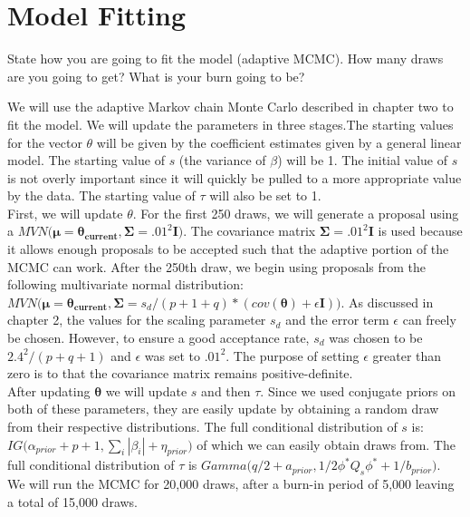 \section{Model Fitting}
State how you are going to fit the model (adaptive MCMC).  How many draws are you going to get?  What is your burn going to be?

We will use the adaptive Markov chain Monte Carlo described in chapter two to fit the model. We will update the parameters in three stages.The starting values for the vector $\theta$ will be given by the coefficient estimates given by a general linear model. The starting value of $s$ (the variance of $\beta$) will be 1. The initial value of $s$ is not overly important since it will quickly be pulled to a more appropriate value by the data. The starting value of $\tau$ will also be set to 1. \\

 First, we will update $\theta$. For the first 250 draws, we will generate a proposal using a $MVN\big(\bm{\mu=\bm{\theta}_{current}}, \bm{\Sigma}=.01^2\bm{I}\big)$. The covariance matrix $\bm{\Sigma}=.01^2\bm{I}$ is used because it allows enough proposals to be accepted such that the adaptive portion of the MCMC can work. After the 250th draw, we begin using proposals from the following multivariate normal distribution: $MVN\big(\bm{\mu=\bm{\theta}_{current}}, \bm{\Sigma}=s_d/(p+1+q) * ( cov(\bm{\theta}) + \epsilon\bm{I})\big)$. As discussed in chapter 2, the values for the scaling parameter $s_d$ and the error term $\epsilon$ can freely be chosen. However, to ensure a good acceptance rate, $s_d$ was chosen to be $2.4^2/(p+q+1)$ and $\epsilon$ was set to $.01^2$. The purpose of setting $\epsilon$ greater than zero is to that the covariance matrix remains positive-definite. \\

 After updating $\bm{\theta}$ we will update $s$ and then  $\tau$. Since we used conjugate priors on both of these parameters, they are easily update by obtaining a random draw from their respective distributions. The full conditional distribution of $s$ is:  $IG\big(\alpha_{prior} + p + 1 ,\sum_i |\beta_i| + \eta_{prior}\big)$ of which we can easily obtain draws from. The full conditional distribution of $\tau$ is $Gamma\big(q/2 + a_{prior},1/2 \phi^*  Q_s  \phi^* + 1/b_{prior}\big)$. \\
 
 We will run the MCMC for 20,000 draws, after a burn-in period of 5,000 leaving a total of 15,000 draws.
 


